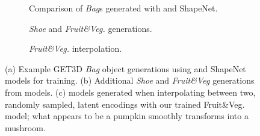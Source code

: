 \begin{figure}[t!]
    \begin{subfigure}[t]{\columnwidth}
        \vspace{-0.225in}
        \vspace{-0.31in}
        \caption{Comparison of \emph{Bag}s generated with \data and ShapeNet.}
    \end{subfigure}
    \begin{subfigure}[t]{\columnwidth}
        \vspace{-0.025in}
        \vspace{-0.31in}
        \caption{\emph{Shoe} and \emph{Fruit\&Veg.} generations.}
    \end{subfigure}
    \begin{subfigure}[t]{\columnwidth}
        \vspace{-0.025in}
        \vspace{-0.31in}
        \caption{\emph{Fruit\&Veg.} interpolation.}
    \end{subfigure}
    \caption{(a) Example GET3D \emph{Bag} object generations using \data and ShapeNet models for training. (b) Additional \emph{Shoe} and \emph{Fruit\&Veg} generations from \data models. (c) models generated when interpolating between two, randomly sampled, latent encodings with our trained Fruit\&Veg{.} model; what appears to be a pumpkin smoothly transforms into a mushroom.}
    \vspace{-1em}
    \label{fig:text-to-3d}
\end{figure}

